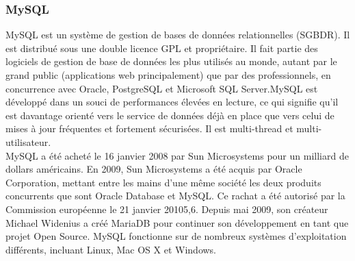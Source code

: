 \subsubsection{MySQL}
MySQL est un système de gestion de bases de données relationnelles (SGBDR). Il est distribué sous une double licence GPL et propriétaire. Il fait partie des logiciels de gestion de base de données les plus utilisés au monde, autant par le grand public (applications web principalement) que par des professionnels, en concurrence avec Oracle, PostgreSQL et Microsoft SQL Server.MySQL est développé dans un souci de performances élevées en lecture, ce qui signifie qu'il est davantage orienté vers le service de données déjà en place que vers celui de mises à jour fréquentes et fortement sécurisées. Il est multi-thread et multi-utilisateur.\\
MySQL a été acheté le 16 janvier 2008 par Sun Microsystems pour un milliard de dollars américains. En 2009, Sun Microsystems a été acquis par Oracle Corporation, mettant entre les mains d'une même société les deux produits concurrents que sont Oracle Database et MySQL. Ce rachat a été autorisé par la Commission européenne le 21 janvier 20105,6.
Depuis mai 2009, son créateur Michael Widenius a créé MariaDB pour continuer son développement en tant que projet Open Source.
MySQL fonctionne sur de nombreux systèmes d'exploitation différents, incluant Linux, Mac OS X et Windows.

